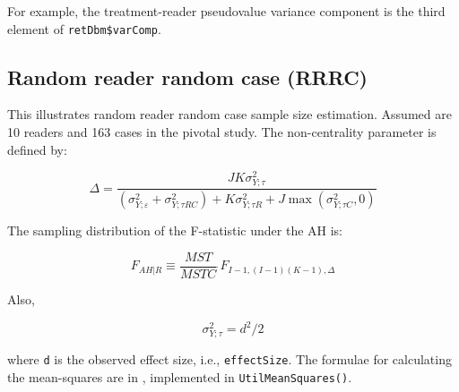 \documentclass[]{book}
\newenvironment{Shaded}{\begin{snugshade}}{\end{snugshade}}
\newcommand{\CommentTok}[1]{\textcolor[rgb]{0.56,0.35,0.01}{\textit{#1}}}
\newcommand{\NormalTok}[1]{#1}
\newcommand{\OperatorTok}[1]{\textcolor[rgb]{0.81,0.36,0.00}{\textbf{#1}}}
\begin{document}
\begin{Shaded}
\end{Shaded}

For example, the treatment-reader pseudovalue variance component is the third element of \texttt{retDbm\$varComp}.

\hypertarget{random-reader-random-case-rrrc}{%
\subsection{Random reader random case (RRRC)}\label{random-reader-random-case-rrrc}}

This illustrates random reader random case sample size estimation. Assumed are 10 readers and 163 cases in the pivotal study. The non-centrality parameter is defined by:

\[\Delta =\frac{JK\sigma _{Y;\tau }^{2}}{\left( \sigma _{Y;\varepsilon }^{2}+\sigma _{Y;\tau RC}^{2} \right)+K\sigma _{Y;\tau R}^{2}+J\max \left( \sigma _{Y;\tau C}^{2},0 \right)}\]

The sampling distribution of the F-statistic under the AH is:

\[{{F}_{\left. AH \right|R}}\equiv \frac{MST}{MSTC}\tilde{\ }{{F}_{I-1,\left( I-1 \right)\left( K-1 \right),\Delta }}\]

Also,

\[\sigma _{Y;\tau }^{2}={{d}^{2}}/2\]

where \texttt{d} is the observed effect size, i.e., \texttt{effectSize}. The formulae for calculating the mean-squares are in \citep{RN1476}, implemented in \texttt{UtilMeanSquares()}.
\end{document}
